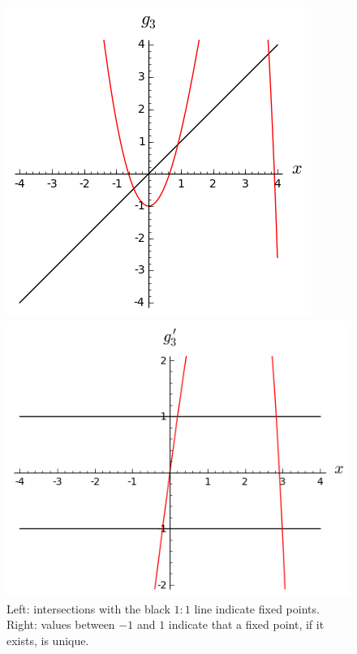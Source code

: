 \documentclass[11pt]{article}
\begin{document}
\begin{figure}[hb!]
\begin{minipage}{0.48\textwidth}
\includegraphics[width=\textwidth]{1_basics/g3.png}
\end{minipage}
\begin{minipage}{0.48\textwidth}
\includegraphics[width=\textwidth]{1_basics/g3p.png}
\end{minipage}
\caption{Left: intersections with the black \(1:1\) line indicate fixed points. Right: values between \(-1\) and \(1\) indicate that a fixed point, if it exists, is unique.}\label{fig::g3}
\end{figure}
\end{document}
